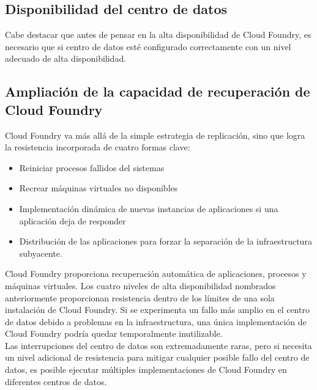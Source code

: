 \documentclass[a4paper,11pt]{article}
\begin{document}
\subsection{Disponibilidad del centro de datos}
Cabe destacar que antes de pensar en la alta disponibilidad de Cloud Foundry, es necesario que si centro de datos esté configurado correctamente con un nivel adecuado de alta disponibilidad.

\subsection{Ampliación de la capacidad de recuperación de Cloud Foundry}
Cloud Foundry va más allá de la simple estrategia de replicación, sino que logra la resistencia incorporada de cuatro formas clave:
\begin{itemize}
  \item Reiniciar procesos fallidos del sistemas
  \item Recrear máquinas virtuales no disponibles
  \item Implementación dinámica de nuevas instancias de aplicaciones si una aplicación deja de responder
  \item Distribución de las aplicaciones para forzar la separación de la infraestructura subyacente.
\end{itemize}
Cloud Foundry proporciona recuperación automática de aplicaciones, procesos y máquinas virtuales. Los cuatro niveles de alta disponibilidad nombrados anteriormente proporcionan resistencia dentro de los límites de una sola instalación de Cloud Foundry. Si se experimenta un fallo más amplio en el centro de datos debido a problemas en la infraestructura, una única implementación de Cloud Foundry podría quedar temporalmente inutilizable.\\
Las interrupciones del centro de datos son extremadamente raras, pero si necesita un nivel adicional de resistencia para mitigar cualquier posible fallo del centro de datos, es posible ejecutar múltiples implementaciones de Cloud Foundry en diferentes centros de datos.
\end{document}
